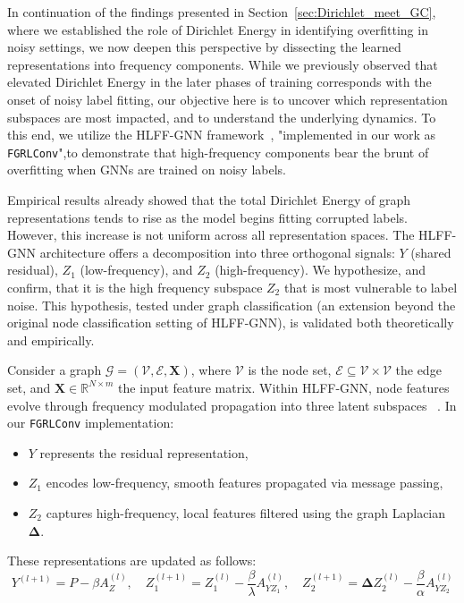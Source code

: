 In continuation of the findings presented in Section~\ref{sec:Dirichlet_meet_GC}, where we established the role of Dirichlet Energy in identifying overfitting in noisy settings, we now deepen this perspective by dissecting the learned representations into frequency components. While we previously observed that elevated Dirichlet Energy in the later phases of training corresponds with the onset of noisy label fitting, our objective here is to uncover which representation subspaces are most impacted, and to understand the underlying dynamics. To this end, we utilize the HLFF-GNN framework~\citet{hlffgnn}, "implemented in our work as \texttt{FGRLConv}",to demonstrate that high-frequency components bear the brunt of overfitting when GNNs are trained on noisy labels.

Empirical results already showed that the total Dirichlet Energy of graph representations tends to rise as the model begins fitting corrupted labels. However, this increase is not uniform across all representation spaces. The HLFF-GNN architecture offers a decomposition into three orthogonal signals: \( Y \) (shared residual), \( Z_1 \) (low-frequency), and \( Z_2 \) (high-frequency). We hypothesize, and confirm, that it is the high frequency subspace \( Z_2 \) that is most vulnerable to label noise. This hypothesis, tested under graph classification (an extension beyond the original node classification setting of HLFF-GNN), is validated both theoretically and empirically.

Consider a graph \( \mathcal{G} = (\mathcal{V}, \mathcal{E}, \mathbf{X}) \), where \( \mathcal{V} \) is the node set, \( \mathcal{E} \subseteq \mathcal{V} \times \mathcal{V} \) the edge set, and \( \mathbf{X} \in \mathbb{R}^{N \times m} \) the input feature matrix. Within HLFF-GNN, node features evolve through frequency modulated propagation into three latent subspaces ~\citep{hlffgnn}. In our \texttt{FGRLConv} implementation:

\begin{itemize}
    \item \( Y \) represents the residual representation,
    \item \( Z_1 \) encodes low-frequency, smooth features propagated via message passing,
    \item \( Z_2 \) captures high-frequency, local features filtered using the graph Laplacian \( \mathbf{\Delta} \).
\end{itemize}

These representations are updated as follows:
\[
Y^{(l+1)} = P - \beta A_Z^{(l)}, \quad
Z_1^{(l+1)} = Z_1^{(l)} - \frac{\beta}{\lambda} A_{YZ_1}^{(l)}, \quad
Z_2^{(l+1)} = \mathbf{\Delta} Z_2^{(l)} - \frac{\beta}{\alpha} A_{YZ_2}^{(l)}
\]

